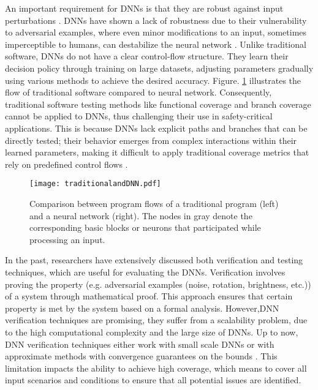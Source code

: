 An important requirement for DNNs is that they are robust against input perturbations \cite{HuangX}. 
DNNs have shown a lack of robustness due to their vulnerability to adversarial examples, where even minor modifications to an input, sometimes imperceptible to humans, can destabilize the neural network \cite{Goodfellow,Carlini}. Unlike traditional software, DNNs do not have a clear control-flow structure. They learn their decision policy through training on large datasets, adjusting parameters gradually using various methods to achieve the desired accuracy. Figure. \ref{fig:Comparison} illustrates the flow of traditional software compared to neural network. Consequently, traditional software testing methods like functional coverage and branch coverage  cannot be applied to DNNs, thus challenging their use in safety-critical applications. This is because DNNs lack explicit paths and branches that can be directly tested; their behavior emerges from complex interactions within their learned parameters, making it difficult to apply traditional coverage metrics that rely on predefined control flows \cite{Sekhon}.

\begin{figure}
  \centering
  \texttt{[image: traditionalandDNN.pdf]}
  \caption{Comparison between program flows of a traditional program (left) and a neural network (right). The nodes in gray denote the corresponding basic blocks or neurons that participated while processing an input.}
  \label{fig:Comparison}
\end{figure}

In the past, researchers have extensively discussed both verification and testing techniques, which are useful for evaluating the DNNs. Verification involves proving the property (e.g. adversarial examples (noise, rotation, brightness, etc.)) of a system through mathematical proof. This approach ensures that certain property is met by the system based on a formal analysis. However,DNN verification techniques are promising, they suffer from a scalability problem, due to the high computational complexity and the large size of DNNs. Up to now, DNN verification techniques either work with small scale DNNs or with approximate methods with convergence guarantees on the bounds \cite{HuangX}. This limitation impacts the ability to achieve high coverage, which means to cover all input scenarios and conditions to ensure that all potential issues are identified.



